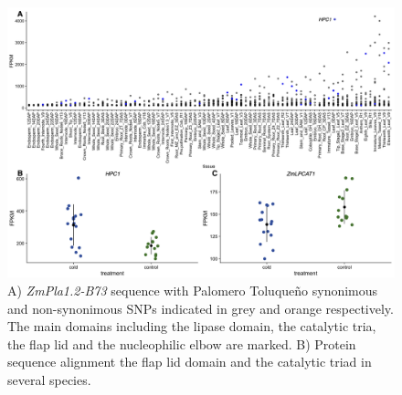 \documentclass[9pt,twocolumn,twoside]{BioRxiv}
\begin{document}
\begin{figure}[t]
\begin{center}
\includegraphics[width=0.8\paperwidth]{Sup_Figures/Sup_Fig_4.png}
\caption{A) \textit{ZmPla1.2-B73} sequence with Palomero Toluqueño synonimous and non-synonimous SNPs indicated in grey and orange respectively. The main domains including the lipase domain, the catalytic tria, the flap lid and the nucleophilic elbow are marked. B) Protein sequence alignment the flap lid domain and the catalytic triad in several species.  
}
\label{SupFig4}
\end{center}
\end{figure}  
\end{document}
